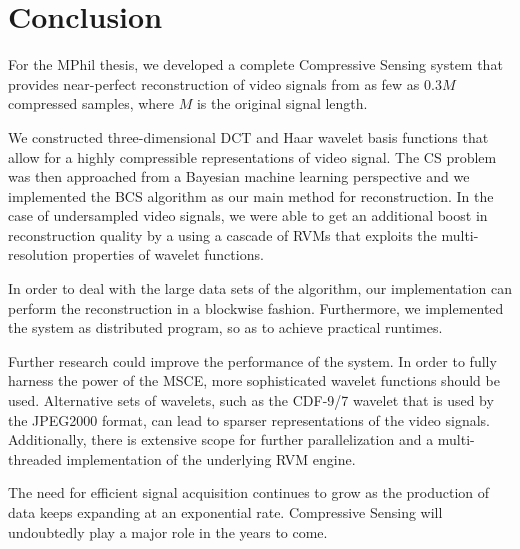 \chapter{Conclusion}
\label{ch:conclusion}

For the MPhil thesis, we developed a complete Compressive Sensing system that provides near-perfect reconstruction of video signals from as few as $0.3M$ compressed samples, where $M$ is the original signal length.

We constructed three-dimensional DCT and Haar wavelet basis functions that allow for a highly compressible representations of video signal.
The CS problem was then approached from a Bayesian machine learning perspective and we implemented the BCS algorithm as our main method for reconstruction.
In the case of undersampled video signals, we were able to get an additional boost in reconstruction quality by a using a cascade of RVMs that exploits the multi-resolution properties of wavelet functions.

In order to deal with the large data sets of the algorithm, our implementation can perform the reconstruction in a blockwise fashion.
Furthermore, we implemented the system as distributed program, so as to achieve practical runtimes.

Further research could improve the performance of the system.
In order to fully harness the power of the MSCE, more sophisticated wavelet functions should be used.
Alternative sets of wavelets, such as the CDF-9/7 wavelet that is used by the JPEG2000 format, can lead to sparser representations of the video signals. 
Additionally, there is extensive scope for further parallelization and a multi-threaded implementation of the underlying RVM engine.

The need for efficient signal acquisition continues to grow as the production of data keeps expanding at an exponential rate.
Compressive Sensing will undoubtedly play a major role in the years to come.